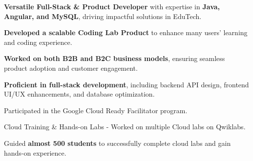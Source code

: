 \documentclass[]{sameer-resume-openfont}
\begin{document}
\begin{minipage}[t]{0.66\textwidth}
\vspace{\topsep} 
\begin{tightemize}
\item \textbf{Versatile Full-Stack \& Product Developer} with expertise in \textbf{Java, Angular, and MySQL}, driving impactful solutions in EduTech.
\item \textbf{Developed a scalable Coding Lab Product} to enhance many users' learning and coding experience.
\item \textbf{Worked on both B2B and B2C business models}, ensuring seamless product adoption and customer engagement.
\item \textbf{Proficient in full-stack development}, including backend API design, frontend UI/UX enhancements, and database optimization.
\end{tightemize}
\sectionsep

\vspace{\topsep} 
\begin{tightemize}
\item Participated in the Google Cloud Ready Facilitator program.
\item Cloud Training \& Hands-on Labs - Worked on multiple Cloud labs on Qwiklabs.
\item Guided \textbf{almost 500 students} to successfully complete cloud labs and gain hands-on experience.
\end{tightemize}
\sectionsep

\end{minipage} 
\end{document}
